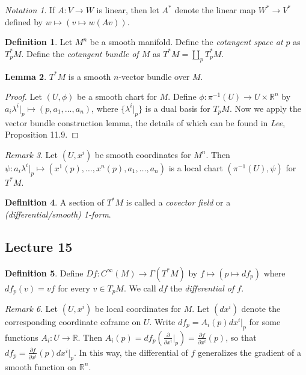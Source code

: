 \documentclass[10pt,letterpaper,cm]{nupset}
\theoremstyle{definition}
\newtheorem{definition}{Definition}[subsection]
\theoremstyle{theorem}
\newtheorem{lemma}[definition]{Lemma}
\theoremstyle{remark}
\newtheorem{remark}[definition]{Remark}
\newtheorem*{notation}{Notation}
\newcommand{\R}{\mathbb R}
\newcommand{\1}{\mathbf{1}}
\newcommand{\0}{\vec 0}
\begin{document}
\begin{notation}
If $A : V \to W$ is linear, then let $A^{\ast}$ denote the linear map  $W^{\ast} \to V^{\ast}$ defined by $w \mapsto (v \mapsto w(Av))$.
\end{notation}

\begin{definition}
Let $M^n$ be a smooth manifold. Define the \textit{cotangent space at $p$} as $T_p^{\ast}M$. Define the \textit{cotangent bundle of $M$} as $T^{\ast}M = \coprod_p T_p^{\ast}M$.
\end{definition}

\begin{lemma}
$T^{\ast}M$ is a smooth $n$-vector bundle over $M$.
\end{lemma}
\begin{proof}
Let $(U, \phi)$ be a smooth chart for $M$. Define $\phi : \pi^{-1}(U) \to U \times \R^n$ by $a_i \lambda^i\rvert_p \mapsto (p, a_1, \ldots, a_n)$, where $\{\lambda^i \rvert_p\}$ is a dual basis for $T_pM$. Now we apply the vector bundle construction lemma, the details of which can be found in \textit{Lee}, Proposition 11.9.
\end{proof}

\begin{remark}
Let $(U, x^i)$ be smooth coordinates for $M^n$. Then $\psi: a_i\lambda^i\rvert_p \mapsto (x^1(p), \ldots, x^n(p), a_1, \ldots, a_n)$ is a local chart $(\pi^{-1}(U), \psi)$ for $T^{\ast}M$.
\end{remark}

\begin{definition}
A section of $T^{\ast}M$ is called a \textit{covector field} or a \textit{(differential/smooth) 1-form}.
\end{definition}

\subsection{Lecture 15}

\begin{definition}
Define $Df : C^{\infty}(M) \to \Gamma(T^{\ast}M)$ by $f \mapsto (p\mapsto df_p)$ where $df_p(v) = vf$ for every $v\in T_pM$. We call $df$ the \textit{differential of $f$}.
\end{definition}

\begin{remark}
Let $(U, x^i)$ be local coordinates for $M$. Let $(dx^i)$ denote the corresponding coordinate coframe on $U$. Write $df_p = A_i(p)dx^i\rvert_p$ for some functions $A_i : U \to \R$. Then $A_i(p) = df_p(\frac{\partial}{\partial{x^i}}\rvert_p) = \frac{\partial{f}}{\partial{x^i}}(p)$, so that $df_p = \frac{\partial{f}}{\partial{x^i}}(p) dx^i\rvert_p$. In this way, the differential of $f$ generalizes the gradient of a smooth function on $\R^n$.
\end{remark}
\end{document}
